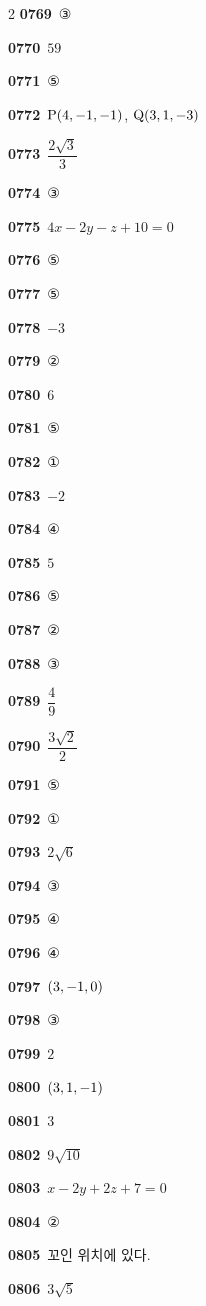 \documentclass[10pt,a4paper]{article}
\newcommand{\pt}[1]{\mathrm{#1}}
\begin{document}
\begin{multicols}{2}
\noindent\textbf{0769}\ ③\par
\noindent\textbf{0770}\ $59$\par
\noindent\textbf{0771}\ ⑤\par
\noindent\textbf{0772}\ $\pt{P}(4{,}\mkern3mu\mathopen{}-1{,}\mkern3mu\mathopen{}-1)$, $\pt{Q}(3{,}\mkern3mu\mathopen{}1{,}\mkern3mu\mathopen{}-3)$\par
\noindent\textbf{0773}\ $\dfrac{2\sqrt{3}}{3}$\par
\noindent\textbf{0774}\ ③\par
\noindent\textbf{0775}\ $4x-2y-z+10=0$\par
\noindent\textbf{0776}\ ⑤\par
\noindent\textbf{0777}\ ⑤\par
\noindent\textbf{0778}\ $-3$\par
\noindent\textbf{0779}\ ②\par
\noindent\textbf{0780}\ $6$\par
\noindent\textbf{0781}\ ⑤\par
\noindent\textbf{0782}\ ①\par
\noindent\textbf{0783}\ $-2$\par
\noindent\textbf{0784}\ ④\par
\noindent\textbf{0785}\ $5$\par
\noindent\textbf{0786}\ ⑤\par
\noindent\textbf{0787}\ ②\par
\noindent\textbf{0788}\ ③\par
\noindent\textbf{0789}\ $\dfrac{4}{9}$\par
\noindent\textbf{0790}\ $\dfrac{3\sqrt{2}}{2}$\par
\noindent\textbf{0791}\ ⑤\par
\noindent\textbf{0792}\ ①\par
\noindent\textbf{0793}\ $2\sqrt{6}$\par
\noindent\textbf{0794}\ ③\par
\noindent\textbf{0795}\ ④\par
\noindent\textbf{0796}\ ④\par
\noindent\textbf{0797}\ $(3{,}\mkern3mu\mathopen{}-1{,}\mkern3mu\mathopen{}0)$\par
\noindent\textbf{0798}\ ③\par
\noindent\textbf{0799}\ $2$\par
\noindent\textbf{0800}\ $(3{,}\mkern3mu\mathopen{}1{,}\mkern3mu\mathopen{}-1)$\par
\noindent\textbf{0801}\ $3$\par
\noindent\textbf{0802}\ $9\sqrt{10}$\par
\noindent\textbf{0803}\ $x-2y+2z+7=0$\par
\noindent\textbf{0804}\ ②\par
\noindent\textbf{0805}\ 꼬인 위치에 있다.\par
\noindent\textbf{0806}\ $3\sqrt{5}$\par
\end{multicols}
\end{document}
